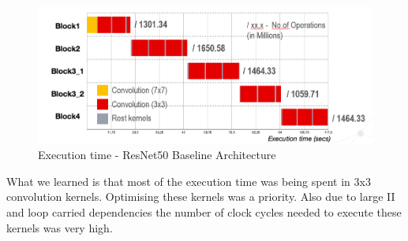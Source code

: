 \begin{figure}[!htb]
  \includegraphics[width=\textwidth,height=\textheight,keepaspectratio]{img/ResNet_baseline_execution.png}
  \caption{Execution time - ResNet50 Baseline Architecture}
  \label{fig:ResNet50_baseline_time}
\end{figure}
What we learned is that most of the execution time was being spent in 3x3 convolution kernels. Optimising these kernels was a priority. Also due to large II and loop carried dependencies the number of clock cycles needed to execute these kernels was very high.  
